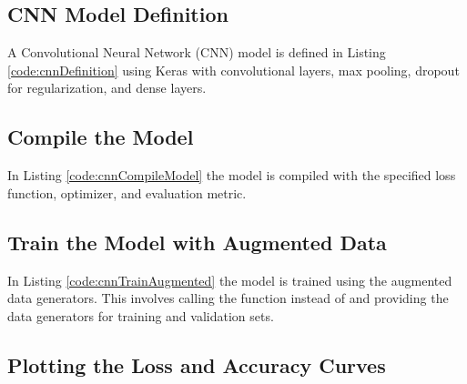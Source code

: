 {	\subsection{CNN Model Definition}
	
	A Convolutional Neural Network (CNN) model is defined in Listing \ref{code:cnnDefinition} using Keras with convolutional layers, max pooling, dropout for regularization, and dense layers.
	
	\begin{code}[h!]
		    
		
		\caption{Defining a Convolutional Neural Network (CNN) model using Keras}
		\label{code:cnnDefinition}
	\end{code}
	
	\subsection{Compile the Model}
	
	In Listing \ref{code:cnnCompileModel} the model is compiled with the specified loss function, optimizer, and evaluation metric.
	
	\begin{code}[h!]
		    
		
		\caption{Compiling the CNN model with specified loss function, optimizer, and metric}
		\label{code:cnnCompileModel}
	\end{code}
	
	\subsection{Train the Model with Augmented Data}
	
	In Listing \ref{code:cnnTrainAugmented} the model is trained using the augmented data generators. This involves calling the  function instead of  and providing the data generators for training and validation sets.
	
	\begin{code}[h!]
		    
		
		\caption{Training the CNN model with augmented data using data generators}
		\label{code:cnnTrainAugmented}
	\end{code}
	
	\subsection{Plotting the Loss and Accuracy Curves}
	
}
